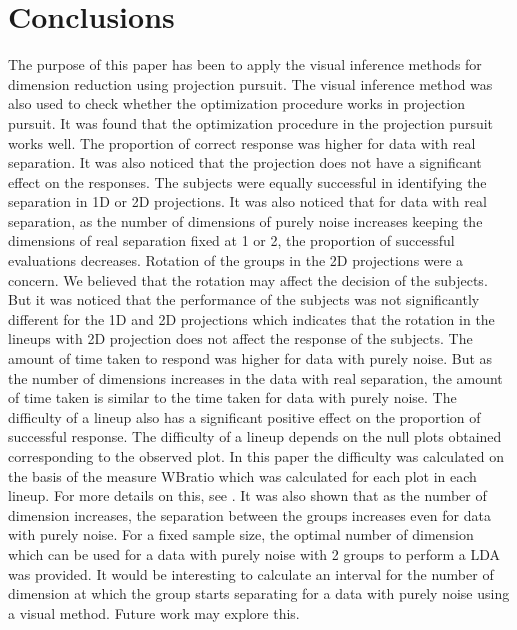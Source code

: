 \section{Conclusions}
The purpose of this paper has been to apply the visual inference methods for dimension reduction using projection pursuit. The visual inference method was also used to check whether the optimization procedure works in projection pursuit. It was found that the optimization procedure in the projection pursuit works well. The proportion of correct response was higher for data with real separation. It was also noticed that the projection does not have a significant effect on the responses. The subjects were equally successful in identifying the separation in 1D or 2D projections. It was also noticed that for data with real separation, as the number of dimensions of purely noise increases keeping the dimensions of real separation fixed at 1 or 2, the proportion of successful evaluations decreases. 
Rotation of the groups in the 2D projections were a concern. We believed that the rotation may affect the decision of the subjects. But it was noticed that the performance of the subjects was not significantly different for the 1D and 2D projections which indicates that the rotation in the lineups with 2D projection does not affect the response of the subjects. The amount of time taken to respond was higher for data with purely noise. But as the number of dimensions increases in the data with real separation, the amount of time taken is similar to the time taken for data with purely noise. The difficulty of a lineup also has a significant positive effect on the proportion of successful response. The difficulty of a lineup depends on the null plots obtained corresponding to the observed plot. In this paper the difficulty was calculated on the basis of the measure WBratio which was calculated for each plot in each lineup. For more details on this, see \cite{roychowdhury:2012}. It was also shown that as the number of dimension increases, the separation between the groups increases even for data with purely noise. For a fixed sample size, the optimal number of dimension which can be used for a data with purely noise with 2 groups to perform a LDA was provided. It would be interesting to calculate an interval for the number of dimension at which the group starts separating for a data with purely noise using a visual method. Future work may explore this.

